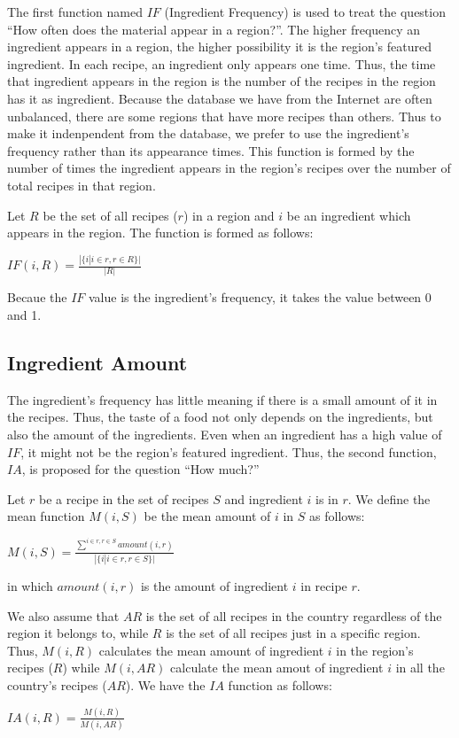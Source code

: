 \documentclass{sig-alternate}
\begin{document}
The first function named $IF$ (Ingredient Frequency) is used to treat the question ``How often does the material appear in a region?''. The higher frequency an ingredient appears in a region, the higher possibility it is the region's featured ingredient. In each recipe, an ingredient only appears one time. Thus, the time that ingredient appears in the region is the number of the recipes in the region has it as ingredient. Because the database we have from the Internet are often unbalanced, there are some regions that have more recipes than others. Thus to make it indenpendent from the database, we prefer to use the ingredient's frequency rather than its appearance times. This function is formed by the number of times the ingredient appears in the region's recipes over the number of total recipes in that region.

Let $R$ be the set of all recipes ($r$) in a region and $i$ be an ingredient which appears in the region. The function is formed as follows:
\begin{center}
\smallskip
$ IF(i,R)= \frac{\displaystyle | \{i | i \in r, r \in R \} | }{\displaystyle | R | }$
\smallskip
\end{center}


Becaue the $IF$ value is the ingredient's frequency, it takes the value between 0 and 1.

\subsection{Ingredient Amount}

The ingredient's frequency has little meaning if there is a small amount of it in the recipes. Thus, the taste of a food not only depends on the ingredients, but also the amount of the ingredients. Even when an ingredient has a high value of $IF$, it might not be the region's featured ingredient. Thus, the second function, $IA$, is proposed for the question ``How much?''

Let $r$ be a recipe in the set of recipes $S$ and ingredient $i$ is in $r$. 
We define the mean function $M(i,S)$ be the mean amount of $i$ in $S$ as follows: 
\begin{center}
\smallskip
$M(i,S)= \frac{\displaystyle \sum_{}^{i \in r, r \in S} amount(i,r)}{\displaystyle |\{i|i \in r, r \in S\}|}$
\smallskip
\end{center}

in which $amount(i,r)$ is the amount of ingredient $i$ in recipe $r$.

We also assume that $AR$ is the set of all recipes in the country regardless of the region it belongs to, while $R$ is the set of all recipes just in a specific region. Thus, $M(i,R)$ calculates the mean amount of ingredient $i$ in the region's recipes ($R$) while $M(i,AR)$ calculate the mean amout of ingredient $i$ in all the country's recipes ($AR$). We have the $IA$ function as follows:
\begin{center}
\smallskip
$IA(i,R)= \frac{\displaystyle M(i,R)}{\displaystyle M(i,AR)}$
\smallskip
\end{center}
\end{document}
